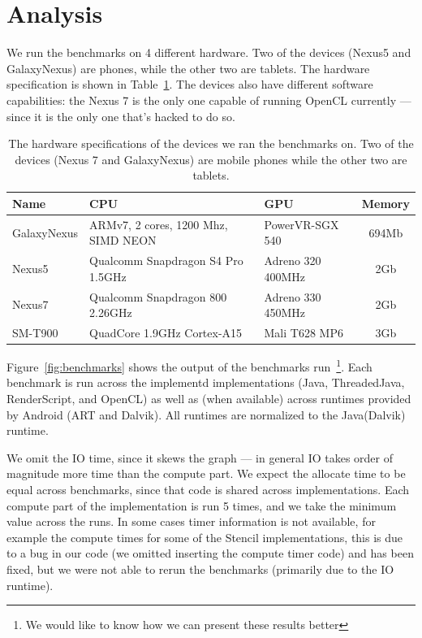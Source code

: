 \section*{Analysis}
\label{sec:analysis}

We run the benchmarks on 4 different hardware.
Two of the devices (Nexus5 and GalaxyNexus) are phones, while the other two are tablets.
The hardware specification is shown in Table~\ref{table:hardware}.
The devices also have different software capabilities: the Nexus 7
  is the only one capable of running OpenCL currently --- since it is the only
  one that's hacked to do so.

\begin{table}[h]\small
\centering
\begin{tabular}{ | l | p{2cm} | p{2cm} | c |}
    \hline 
    Name & CPU & GPU & Memory \\ \hline
    GalaxyNexus & ARMv7, 2 cores, 1200 Mhz, SIMD NEON & PowerVR-SGX 540 & 694Mb \\ \hline
    Nexus5 & Qualcomm Snapdragon S4 Pro 1.5GHz & Adreno 320 400MHz & 2Gb} \\ \hline
    Nexus7 & Qualcomm Snapdragon 800 2.26GHz & Adreno 330 450MHz & 2Gb} \\ \hline
    SM-T900 & QuadCore 1.9GHz Cortex-A15 & Mali T628 MP6 & 3Gb} \\ \hline
    \hline
\end{tabular}
\caption{The hardware specifications of the devices we ran the benchmarks on. Two of the devices (Nexus 7 and GalaxyNexus) are mobile phones while the other two are tablets.}
\label{table:hardware}
\end{table}

Figure~\ref{fig:benchmarks} shows the output of the benchmarks run~\footnote{We would like to know how we can present these results better}.
Each benchmark is run across the implementd implementations (Java, ThreadedJava, RenderScript, and OpenCL) as well as (when available) across runtimes provided by Android (ART and Dalvik).
All runtimes are normalized to the Java(Dalvik) runtime.

We omit the IO time, since it skews the graph --- in general IO takes 
  order of magnitude more time than the compute part.
We expect the allocate time to be equal across benchmarks, since
  that code is shared across implementations.
Each compute part of the implementation is run 5 times, and we 
  take the minimum value across the runs.
In some cases timer information is not available, for example the compute times for some of the Stencil implementations, this is due to a bug in our code (we omitted inserting the compute timer code) and has been fixed, but we were not able to rerun the benchmarks (primarily due to the IO runtime).

